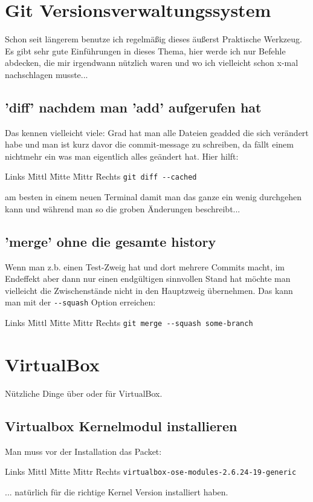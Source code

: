 \documentclass[12pt]{article}
\newenvironment{code}{\begin{tabbing}Links \= Mittl \= Mitte \= Mittr \= Rechts \kill}{\end{tabbing}}
\begin{document}
\section{Git Versionsverwaltungssystem}
Schon seit längerem benutze ich regelmäßig dieses äußerst Praktische Werkzeug.
Es gibt sehr gute Einführungen in dieses Thema, hier werde ich nur Befehle abdecken, die 
mir irgendwann nützlich waren und wo ich vielleicht schon x-mal nachschlagen musste...

\subsection{'diff' nachdem man 'add' aufgerufen hat}
Das kennen vielleicht viele: Grad hat man alle Dateien geadded die sich verändert habe und man
ist kurz davor die commit-message zu schreiben, da fällt einem nichtmehr ein was man eigentlich alles
geändert hat. Hier hilft:
\begin{code}
	\> \verb#git diff --cached#
\end{code}
am besten in einem neuen Terminal damit man das ganze ein wenig durchgehen kann und während man so
die groben Änderungen beschreibt...

\subsection{'merge' ohne die gesamte history}
Wenn man z.b. einen Test-Zweig hat und dort mehrere Commits macht, im Endeffekt aber 
dann nur einen endgültigen sinnvollen Stand hat möchte man vielleicht die Zwischenstände
nicht in den Hauptzweig übernehmen. Das kann man mit der \verb#--squash#
Option erreichen:
\begin{code}
	\> \verb#git merge --squash some-branch#
\end{code}

\section{VirtualBox}
Nützliche Dinge über oder für VirtualBox.
\subsection{Virtualbox Kernelmodul installieren}
Man muss vor der Installation das Packet:
\begin{code}
  \> \verb#virtualbox-ose-modules-2.6.24-19-generic# 
\end{code}
... natürlich für die richtige Kernel Version installiert haben.
\end{document}
